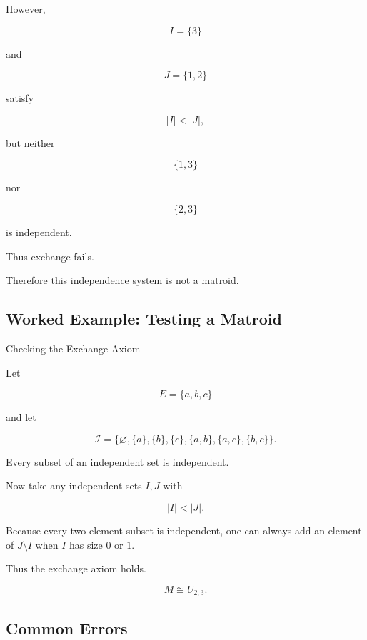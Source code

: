 However,

\[
I=\{3\}
\]

and

\[
J=\{1,2\}
\]

satisfy

\[
|I|<|J|,
\]

but neither

\[
\{1,3\}
\]

nor

\[
\{2,3\}
\]

is independent.

Thus exchange fails.

Therefore this independence system is not a matroid.

\subsection{Worked Example: Testing a Matroid}
\label{subsec:worked-testing-matroid}

\begin{workedexamplebox}{Checking the Exchange Axiom}

Let

\[
E=\{a,b,c\}
\]

and let

\[
\mathcal{I}
=
\{
\varnothing,
\{a\},
\{b\},
\{c\},
\{a,b\},
\{a,c\},
\{b,c\}
\}.
\]

Every subset of an independent set is independent.

Now take any independent sets \(I,J\) with

\[
|I|<|J|.
\]

Because every two-element subset is independent, one can always add an
element of \(J\setminus I\) when \(I\) has size \(0\) or \(1\).

Thus the exchange axiom holds.

\begin{answerbox}
\[
\boxed{
M\cong U_{2,3}.
}
\]
\end{answerbox}

\end{workedexamplebox}

\subsection{Common Errors}
\label{subsec:matroid-common-errors}

